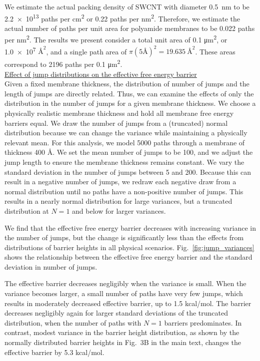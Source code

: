\noindent We estimate the actual packing density of SWCNT with diameter 0.5~nm to be \num{2.2e13} paths per \unit{\cm\squared} or 0.22 paths per \unit{\nm\squared}. Therefore, we estimate the actual number of paths per unit area for polyamide membranes to be 0.022 paths per \unit{\nm\squared}. The results we present consider a total unit area of 0.1 \unit{\um\squared}, or \num{1.0e7} $\text{\AA}^2$, and a single path area of $\pi (5 \text{\AA})^2 = 19.635~\text{\AA}^2$. These areas correspond to 2196 paths per 0.1 \unit{\um\squared}. \\

\noindent \underline{Effect of jump distributions on the effective free energy barrier} \\
Given a fixed membrane thickness, the distribution of number of jumps and the length of jumps are directly related. Thus, we can examine the effects of only the distribution in the number of jumps for a given membrane thickness. We choose a physically realistic membrane thickness and hold all membrane free energy barriers equal. We draw the number of jumps from a (truncated) normal distribution because we can change the variance while maintaining a physically relevant mean. For this analysis, we model 5000 paths through a membrane of thickness 400 \AA. We set the mean number of jumps to be 100, and we adjust the jump length to ensure the membrane thickness remains constant. We vary the standard deviation in the number of jumps between 5 and 200. Because this can result in a negative number of jumps, we redraw each negative draw from a normal distribution until no paths have a non-positive number of jumps. This results in a nearly normal distribution for large variances, but a truncated distribution at $N=1$ and below for larger variances. 

We find that the effective free energy barrier decreases with increasing variance in the number of jumps, but the change is significantly less than the effects from distributions of barrier heights in all physical scenarios. Fig.~\ref{fig:jump_variances} shows the relationship between the effective free energy barrier and the standard deviation in number of jumps. 

The effective barrier decreases negligibly when the variance is small. When the variance becomes larger, a small number of paths have very few jumps, which results in moderately decreased effective barrier, up to 1.5 kcal/mol. The barrier decreases negligibly again for larger standard deviations of the truncated distribution, when the number of paths with $N=1$ barriers predominates. In contrast, modest variance in the barrier height distribution, as shown by the normally distributed barrier heights in Fig.~3B in the main text, changes the effective barrier by 5.3 kcal/mol.

